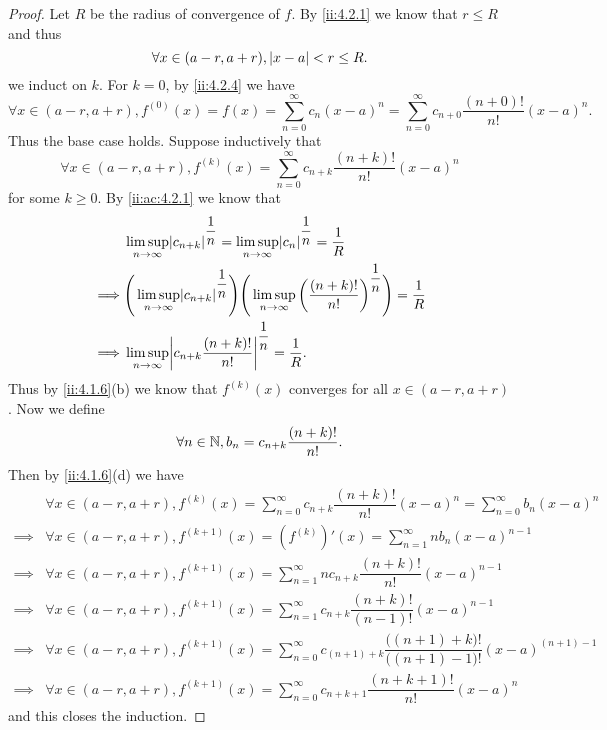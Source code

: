 \begin{proof}
  Let \(R\) be the radius of convergence of \(f\).
  By \cref{ii:4.2.1} we know that \(r \leq R\) and thus
  \[
    \forall x \in (a - r, a + r), \left\lvert x - a\right\rvert < r \leq R.
  \]
  we induct on \(k\).
  For \(k = 0\), by \cref{ii:4.2.4} we have
  \[
    \forall x \in (a - r, a + r), f^{(0)}(x) = f(x) = \sum_{n = 0}^\infty c_n (x - a)^n = \sum_{n = 0}^\infty c_{n + 0} \dfrac{(n + 0)!}{n!} (x - a)^n.
  \]
  Thus the base case holds.
  Suppose inductively that
  \[
    \forall x \in (a - r, a + r), f^{(k)}(x) = \sum_{n = 0}^\infty c_{n + k} \dfrac{(n + k)!}{n!} (x - a)^n
  \]
  for some \(k \geq 0\).
  By \cref{ii:ac:4.2.1} we know that
  \begin{align*}
             & \limsup_{n \to \infty} \abs{c_{n + k}}^{\dfrac{1}{n}} = \limsup_{n \to \infty} \abs{c_n}^{\dfrac{1}{n}} = \dfrac{1}{R}                                              \\
    \implies & \Bigg(\limsup_{n \to \infty} \abs{c_{n + k}}^{\dfrac{1}{n}}\Bigg) \Bigg(\limsup_{n \to \infty} \bigg(\dfrac{(n + k)!}{n!}\bigg)^{\dfrac{1}{n}}\Bigg) = \dfrac{1}{R} \\
    \implies & \limsup_{n \to \infty} \abs{c_{n + k} \dfrac{(n + k)!}{n!}}^{\dfrac{1}{n}} = \dfrac{1}{R}.
  \end{align*}
  Thus by \cref{ii:4.1.6}(b) we know that \(f^{(k)}(x)\) converges for all \(x \in (a - r, a + r)\).
  Now we define
  \[
    \forall n \in \mathbb{N}, b_n = c_{n + k} \dfrac{(n + k)!}{n!}.
  \]
  Then by \cref{ii:4.1.6}(d) we have
  \begin{align*}
             & \forall x \in (a - r, a + r), f^{(k)}(x) = \sum_{n = 0}^\infty c_{n + k} \dfrac{(n + k)!}{n!} (x - a)^n = \sum_{n = 0}^\infty b_n (x - a)^n                     \\
    \implies & \forall x \in (a - r, a + r), f^{(k + 1)}(x) = (f^{(k)})'(x) = \sum_{n = 1}^\infty n b_n (x - a)^{n - 1}                                                        \\
    \implies & \forall x \in (a - r, a + r), f^{(k + 1)}(x) = \sum_{n = 1}^\infty n c_{n + k} \dfrac{(n + k)!}{n!} (x - a)^{n - 1}                                             \\
    \implies & \forall x \in (a - r, a + r), f^{(k + 1)}(x) = \sum_{n = 1}^\infty c_{n + k} \dfrac{(n + k)!}{(n - 1)!} (x - a)^{n - 1}                                         \\
    \implies & \forall x \in (a - r, a + r), f^{(k + 1)}(x) = \sum_{n = 0}^\infty c_{(n + 1) + k} \dfrac{\big((n + 1) + k\big)!}{\big((n + 1) - 1\big)!} (x - a)^{(n + 1) - 1} \\
    \implies & \forall x \in (a - r, a + r), f^{(k + 1)}(x) = \sum_{n = 0}^\infty c_{n + k + 1} \dfrac{(n + k + 1)!}{n!} (x - a)^n
  \end{align*}
  and this closes the induction.
\end{proof}

